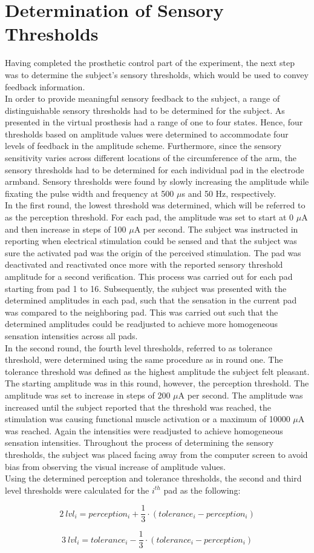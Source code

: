 
\section{Determination of Sensory Thresholds}

Having completed the prosthetic control part of the experiment, the next step was to determine the subject's sensory thresholds, which would be used to convey feedback information.\\
In order to provide meaningful sensory feedback to the subject, a range of distinguishable sensory thresholds had to be determined for the subject. As presented in  the virtual prosthesis had a range of one to four states. Hence, four thresholds based on amplitude values were determined to accommodate four levels of feedback in the amplitude scheme. Furthermore, since the sensory sensitivity varies across different locations of the circumference of the arm, the sensory thresholds had to be determined for each individual pad in the electrode armband. Sensory thresholds were found by slowly increasing the amplitude while fixating the pulse width and frequency at 500 $\mu$s and 50 Hz, respectively. \\
In the first round, the lowest threshold was determined, which will be referred to as the perception threshold. For each pad, the amplitude was set to start at 0 $\mu $A and then increase in steps of 100 $\mu$A per second. The subject was instructed in reporting when electrical stimulation could be sensed and that the subject was sure the activated pad was the origin of the perceived stimulation. The pad was deactivated and reactivated once more with the reported sensory threshold amplitude for a second verification. This process was carried out for each pad starting from pad 1 to 16. Subsequently, the subject was presented with the determined amplitudes in each pad, such that the sensation in the current pad was compared to the neighboring pad. This was carried out such that the determined amplitudes could be readjusted to achieve more homogeneous sensation intensities across all pads.  \\
In the second round, the fourth level thresholds, referred to as tolerance threshold, were determined using the same procedure as in round one. The tolerance threshold was defined as the highest amplitude the subject felt pleasant. The starting amplitude was in this round, however, the perception threshold. The amplitude was set to increase in steps of 200 $\mu$A per second. The amplitude was increased until the subject reported that the threshold was reached, the stimulation was causing functional muscle activation or a maximum of 10000 $\mu$A was reached. Again the intensities were readjusted to achieve homogeneous sensation intensities. Throughout the process of determining the sensory thresholds, the subject was placed facing away from the computer screen to avoid bias from observing the visual increase of amplitude values.  \\ 
Using the determined perception and tolerance thresholds, the second and third level thresholds were calculated for the $i^{th}$ pad as the following:

	\begin{equation}
2~lvl_i = perception_i + \frac{1}{3} \cdot (tolerance_i - perception_i)
\end{equation}

\begin{equation}
3~lvl_i = tolerance_i - \frac{1}{3} \cdot (tolerance_i - perception_i)
\end{equation}
       